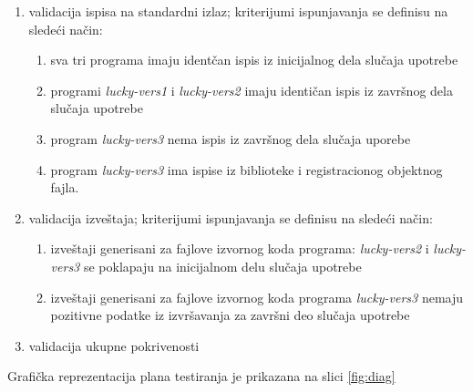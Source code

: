 \documentclass[12pt,oneside]{memoir}
\newcommand{\strano}[1]{\textit{#1}}
\begin{document}
\begin{enumerate}
\begin{enumerate}
\item validacija ispisa na standardni izlaz; kriterijumi ispunjavanja se definisu na sledeći način:
\begin{enumerate}
\item sva tri programa imaju identčan ispis iz inicijalnog dela slučaja upotrebe
\item programi \strano{lucky-vers1} i  \strano{lucky-vers2} imaju identičan ispis iz završnog dela slučaja upotrebe
\item program \strano{lucky-vers3} nema ispis iz završnog dela slučaja uporebe
\item program \strano{lucky-vers3} ima ispise iz biblioteke i registracionog objektnog fajla.
\end{enumerate}
\item validacija izveštaja; kriterijumi ispunjavanja se definisu na sledeći način: 
\begin{enumerate}
\item izveštaji generisani za fajlove izvornog koda programa: \strano{lucky-vers2} i \strano{lucky-vers3} se poklapaju na inicijalnom delu slučaja upotrebe
\item izveštaji generisani za fajlove izvornog koda programa \strano{lucky-vers3} nemaju pozitivne podatke iz izvršavanja za završni deo slučaja upotrebe
\end{enumerate}
\item validacija ukupne pokrivenosti
\end{enumerate}
\end{enumerate}

Grafička reprezentacija plana testiranja je prikazana na slici \ref{fig:diag}
\end{document}
